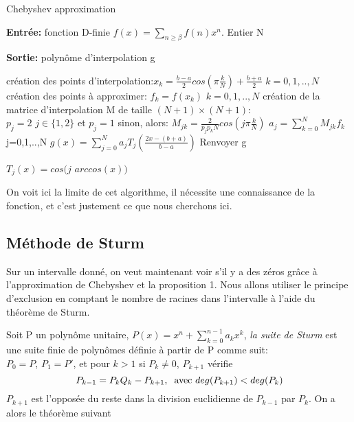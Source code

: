 \documentclass[a4paper,10.5pt]{article}
\begin{document}
	
	\begin{algorithm}
		\caption{Chebyshev approximation}
		
		\vspace{2mm}
		
		\textbf{Entrée:} fonction D-finie $f(x)=\sum_{n \geq\beta} f(n)x^{n}$. Entier N
		
		\textbf{Sortie:} polynôme d'interpolation g
		
		\begin{algorithmic}[1]
			
			\STATE création des points d'interpolation:$x_{k}=\frac{b-a}{2}cos(\pi\frac{k}{N})+\frac{b+a}{2}$  $k=0,1,..,N$
			\STATE création des points à approximer: $f_{k}=f(x_{k})$ $k=0,1,..,N$
			\STATE création de la matrice d'interpolation M de taille $(N+1)\times (N+1)$:\\
			$p_{j}=2$ $j\in\{1,2\}$ et $p_{j}=1$ sinon, alors:
			$M_{jk}=\frac{2}{p_{j}p_{k}N}cos(j\pi\frac{k}{N})$
			\STATE $a_{j}=\sum_{k=0}^{N}M_{jk}f_{k}$ j=0,1,..,N
			\STATE $g(x)=\sum_{j=0}^{N}a_{j}T_{j}(\frac{2x-(b+a)}{b-a})$
			\STATE Renvoyer g
		\end{algorithmic}
		
	\end{algorithm}
	
	\noindent $T_{j}(x)=cos(j$  $arccos(x))$
	
	\noindent On voit ici la limite de cet algorithme, il nécessite une connaissance de la fonction, et c'est justement ce que nous cherchons ici.
	
	
	\subsection{Méthode de Sturm}
	
	Sur un intervalle donné, on veut maintenant voir s'il y a des zéros grâce à l'approximation de Chebyshev et la proposition 1. Nous allons utiliser le principe d'exclusion en comptant le nombre de racines dans l'intervalle à l'aide du théorème de Sturm.
	
	
	Soit P un polynôme unitaire, $P(x)=x^{n} + \sum^{n-1}_{k=0}a_{k}x^{k}$, \textit {la suite de Sturm} est une suite finie de polynômes définie à partir de P comme suit:\\
	$P_{0}=P$, $P_{1}=P'$, et pour $k > 1$ si $P_{k} \neq 0$,  $P_{k+1}$ vérifie
	\[P_{k-1}=P_{k}Q_{k}-P_{k+1},\hspace{2mm}\text{avec }    deg(P_{k+1})<deg(P_{k})\] 
	$P_{k+1}$ est l'opposée du reste dans la division euclidienne de $P_{k-1}$ par $P_{k}$. On a alors le théorème suivant 
	
\end{document}
